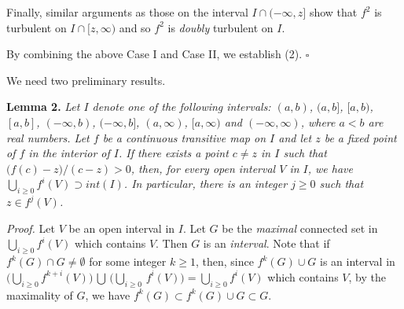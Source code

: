 \documentclass[12pt]{article}
\newcommand{\sq}{$\square$}
\begin{document}
Finally, similar arguments as those on the interval $I \cap (-\infty, z]$ show that $f^2$ is turbulent on $I \cap [z, \infty)$ and so $f^2$ is {\it doubly} turbulent on $I$.  

By combining the above Case I and Case II, we establish (2). 
\hfill\sq

We need two preliminary results.

\noindent
{\bf Lemma 2.}
{\it Let $I$ denote one of the following intervals: $(a, b)$, $(a, b]$, $[a, b)$, $[a, b]$, $(-\infty, b)$, $(-\infty, b]$, $(a, \infty)$, $[a, \infty)$ and $(-\infty, \infty)$, where $a < b$ are real numbers.  Let $f$ be a continuous transitive map on $I$ and let $z$ be a fixed point of $f$ in the interior of $I$.  If there exists a point $c \ne z$ in $I$ such that $\big(f(c) - z\big)/(c - z) > 0$, then, for every open interval $V$ in $I$, we have $\bigcup_{i \ge 0} f^i(V) \supset int(I)$.  In particular, there is an integer $j \ge 0$ such that $z \in f^j(V)$.}

\noindent
{\it Proof.}
Let $V$ be an open interval in $I$.  Let $G$ be the {\it maximal} connected set in $\bigcup_{i \ge 0} f^i(V)$ which contains $V$.  Then $G$ is an {\it interval}.  Note that if $f^k(G) \cap G \ne \emptyset$ for some integer $k \ge 1$, then, since $f^k(G) \cup G$ is an interval in $\big(\bigcup_{i \ge 0} f^{k+i}(V)\big) \, \bigcup \, \big(\bigcup_{i \ge 0} \, f^i(V)\big) = \bigcup_{i \ge 0} f^i(V)$ which contains $V$, by the maximality of $G$, we have $f^k(G) \subset f^k(G) \cup G \subset G$.
\end{document}
